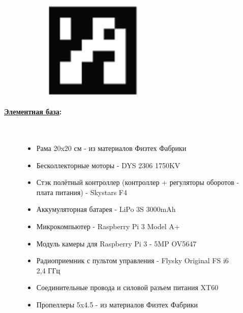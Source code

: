 \documentclass[a4paper,12pt]{article} %
\begin{document}
\begin{figure}[h]
\begin{subfigure}{0.2\textwidth}
    \end{subfigure}
    \hfill
    \begin{subfigure}{0.2\textwidth}
        \includegraphics[width=\linewidth]{../img/aruco.png}
    \end{subfigure}
\end{figure}

\paragraph{\underline{Элементная база}:}\
\begin{figure}[h]
    \begin{itemize}
        \item Рама 20x20 см - из материалов Физтех Фабрики
        \item Бесколлекторные моторы - DYS 2306 1750KV
        \item Стэк полётный контроллер (контроллер + регуляторы оборотов - плата питания) - Skystars F4
        \item Аккумуляторная батарея - LiPo 3S 3000mAh
        \item Микрокомпьютер - Raspberry Pi 3 Model A+
        \item Модуль камеры для Raspberry Pi 3 - 5MP OV5647
        \item Радиоприемник с пультом управления - Flysky Original FS i6 2,4 ГГц
        \item Соединительные провода и силовой разъем питания XT60
        \item Пропеллеры 5x4.5 - из материалов Физтех Фабрики
    \end{itemize}
\end{figure}
\end{document}
